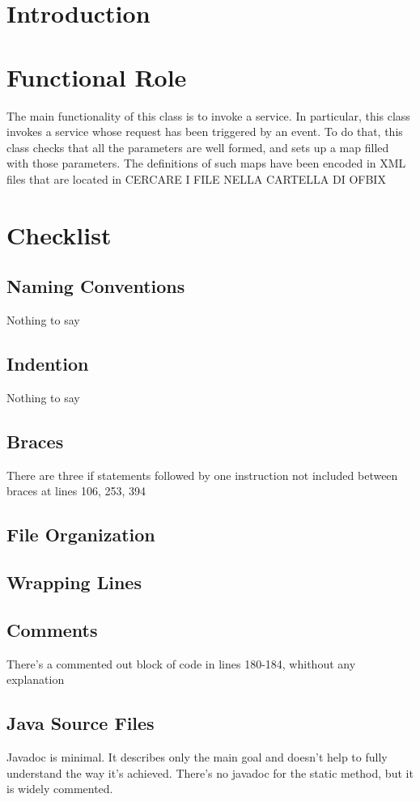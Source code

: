 \documentclass{article}
\begin{document}
\section{Introduction}

\section{Functional Role}
The main functionality of this class is to invoke a service. In particular, this class invokes a service whose request has been triggered by an event. To do that, this class checks that all the parameters are well formed, and sets up a map filled with those parameters. The definitions of such maps have been encoded in XML files that are located in CERCARE I FILE NELLA CARTELLA DI OFBIX

\section{Checklist}
\subsection{Naming Conventions}
Nothing to say
\subsection{Indention}
Nothing to say
\subsection{Braces}
There are three if statements followed by one instruction not included between braces at lines 106, 253, 394
\subsection{File Organization}

\subsection{Wrapping Lines}

\subsection{Comments}
There's a commented out block of code in lines 180-184, whithout any explanation

\subsection{Java Source Files}
Javadoc is minimal. It describes only the main goal and doesn't help to fully understand the way it's achieved. There's no javadoc for the static method, but it is widely commented.
\end{document}
